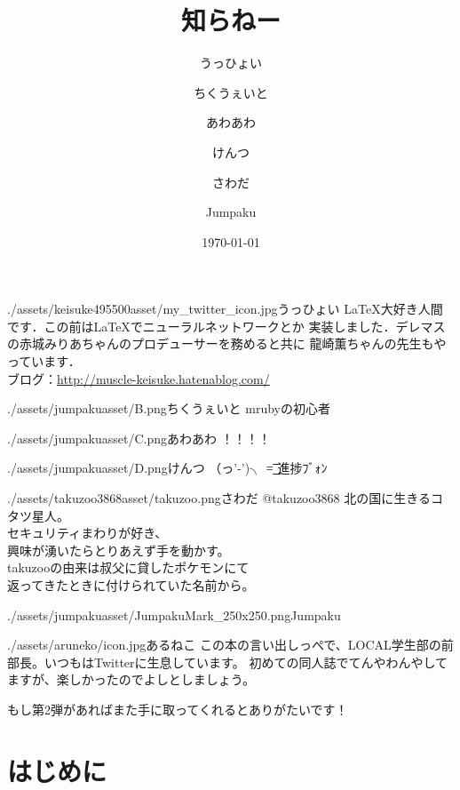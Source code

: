 \documentclass[autodetect-engine,dvipdfmx-if-dvi,ja=standard,a5paper,10.5pt,twoside,openany,layout=v2]{bxjsbook}
\title{知らねー}
\author{うっひょい \and ちくうぇいと \and あわあわ \and けんつ \and さわだ \and Jumpaku}
\date{\today}
\newcommand{\articlepath}{./articles}
\newcommand{\assetspath}{./assets}
\newcommand{\jumpakuasset}{\assetspath/jumpakuasset}
\newcommand{\takuzooasset}{\assetspath/takuzoo3868asset}
\newcommand{\keisukeasset}{\assetspath/keisuke495500asset}
\begin{document}
\frontmatter
\maketitle
\begin{myintroduce}{\keisukeasset/my_twitter_icon.jpg}{うっひょい}
  \LaTeX 大好き人間です．この前は\LaTeX でニューラルネットワークとか
  実装しました．デレマスの赤城みりあちゃんのプロデューサーを務めると共に
  龍崎薫ちゃんの先生もやっています．\\
  ブログ：\url{http://muscle-keisuke.hatenablog.com/}
\end{myintroduce}
\begin{myintroduce}{\jumpakuasset/B.png}{ちくうぇいと}
  mrubyの初心者
\end{myintroduce}
\begin{myintroduce}{\jumpakuasset/C.png}{あわあわ}
  ！！！！
\end{myintroduce}
\begin{myintroduce}{\jumpakuasset/D.png}{けんつ}
  （っ'-')╮ =͟͟͞͞ 進捗ﾌﾞｫﾝ
\end{myintroduce}
\begin{myintroduce}{\takuzooasset/takuzoo.png}{さわだ @takuzoo3868}
    北の国に生きるコタツ星人。\\
    セキュリティまわりが好き、\\
    興味が湧いたらとりあえず手を動かす。\\
    takuzooの由来は叔父に貸したポケモンにて\\
    返ってきたときに付けられていた名前から。
\end{myintroduce}
\begin{myintroduce}{\jumpakuasset/JumpakuMark_250x250.png}{Jumpaku}

\end{myintroduce}

\begin{myintroduce}{./assets/aruneko/icon.jpg}{あるねこ}
  この本の言い出しっぺで、LOCAL学生部の前部長。いつもはTwitterに生息しています。
  初めての同人誌でてんやわんやしてますが、楽しかったのでよしとしましょう。
  
  もし第2弾があればまた手に取ってくれるとありがたいです！
\end{myintroduce}

\chapter{はじめに}

\end{document}
